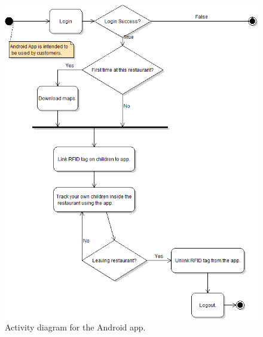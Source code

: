 \documentclass[11pt,titlepage]{article} %
\begin{document}
\begin{figure}[H]
\centering
\includegraphics[scale=0.7]{AndroidActivity.png}
\caption{Activity diagram for the Android app.}
\end{figure}
\end{document}
